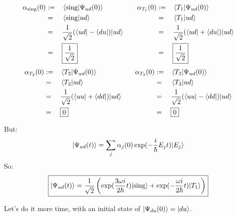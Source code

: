 \documentclass[solutions.tex]{subfiles}
\begin{document}
\begin{equation*}\begin{aligned}
	\alpha_{\text{sing}}(0) &:=&& \left\langle \text{sing} \middle| \Psi_{ud}(0) \right\rangle &&&
	\alpha_{T_1}(0) &:=&& \left\langle T_1 \middle| \Psi_{ud}(0) \right\rangle \\
	~ &=&& \left\langle \text{sing} \middle| ud \right\rangle &&&
	~ &=&& \left\langle T_1 \middle| ud \right\rangle \\
	~ &=&& \frac1{\sqrt2}(\langle ud|-\langle du|)|ud\rangle &&&
	~ &=&& \frac1{\sqrt2}(\langle ud|+\langle du|)|ud\rangle \\
	~ &=&& \boxed{\frac1{\sqrt2}} &&&
	~ &=&& \boxed{\frac1{\sqrt2}} \\
\end{aligned}\end{equation*}
\begin{equation*}\begin{aligned}
	\alpha_{T_2}(0) &:=&& \left\langle T_2 \middle| \Psi_{ud}(0) \right\rangle &&&
	\alpha_{T_3}(0) &:=&& \left\langle T_3 \middle| \Psi_{ud}(0) \right\rangle \\
	~ &=&& \left\langle T_2 \middle| ud \right\rangle &&&
	~ &=&& \left\langle T_3 \middle| ud \right\rangle \\
	~ &=&& \frac1{\sqrt2}(\langle uu|+\langle dd|)|ud\rangle &&&
	~ &=&& \frac1{\sqrt2}(\langle uu|-\langle dd|)|ud\rangle \\
	~ &=&& \boxed{0} &&&
	~ &=&& \boxed{0} \\
\end{aligned}\end{equation*}

But:
\[
	|\Psi_{ud}(t)\rangle = \sum_j\alpha_j(0)\exp(-\frac{i}\hbar E_jt)|E_j\rangle
\]
So:
\[
	\boxed{
		|\Psi_{ud}(t)\rangle = \frac1{\sqrt2}\left(
			\exp(\frac{3\omega i}{2\hbar} t)|\text{sing}\rangle
			+\exp(-\frac{\omega i}{2\hbar} t)|T_1\rangle
		\right)
	}
\]

\hr

Let's do it more time, with an initial state of $|\Psi_{du}(0)\rangle = |du\rangle$.
\end{document}
